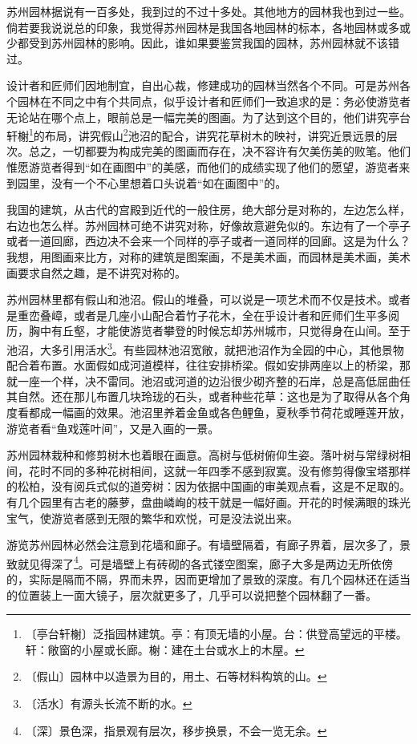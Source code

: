 \documentclass[12pt,UTF-8,openany]{ctexbook}
\begin{document}
\begin{normalsize}
    
    苏州园林据说有一百多处，我到过的不过十多处。其他地方的园林我也到过一些。倘若要我说说总的印象，我觉得苏州园林是我国各地园林的标本，各地园林或多或少都受到苏州园林的影响。因此，谁如果要鉴赏我国的园林，苏州园林就不该错过。
    
    设计者和匠师们因地制宜，自出心裁，修建成功的园林当然各个不同。可是苏州各个园林在不同之中有个共同点，似乎设计者和匠师们一致追求的是：务必使游览者无论站在哪个点上，眼前总是一幅完美的图画。为了达到这个目的，他们讲究亭台轩榭\footnote{〔亭台轩榭〕泛指园林建筑。亭：有顶无墙的小屋。台：供登高望远的平楼。轩：敞窗的小屋或长廊。榭：建在土台或水上的木屋。}的布局，讲究假山\footnote{〔假山〕园林中以造景为目的，用土、石等材料构筑的山。}池沼的配合，讲究花草树木的映衬，讲究近景远景的层次。总之，一切都要为构成完美的图画而存在，决不容许有欠美伤美的败笔。他们惟愿游览者得到“如在画图中”的美感，而他们的成绩实现了他们的愿望，游览者来到园里，没有一个不心里想着口头说着“如在画图中”的。
    
    我国的建筑，从古代的宫殿到近代的一般住房，绝大部分是对称的，左边怎么样，右边也怎么样。苏州园林可绝不讲究对称，好像故意避免似的。东边有了一个亭子或者一道回廊，西边决不会来一个同样的亭子或者一道同样的回廊。这是为什么？我想，用图画来比方，对称的建筑是图案画，不是美术画，而园林是美术画，美术画要求自然之趣，是不讲究对称的。
    
    苏州园林里都有假山和池沼。假山的堆叠，可以说是一项艺术而不仅是技术。或者是重峦叠嶂，或者是几座小山配合着竹子花木，全在乎设计者和匠师们生平多阅历，胸中有丘壑，才能使游览者攀登的时候忘却苏州城市，只觉得身在山间。至于池沼，大多引用活水\footnote{〔活水〕有源头长流不断的水。}。有些园林池沼宽敞，就把池沼作为全园的中心，其他景物配合着布置。水面假如成河道模样，往往安排桥梁。假如安排两座以上的桥梁，那就一座一个样，决不雷同。池沼或河道的边沿很少砌齐整的石岸，总是高低屈曲任其自然。还在那儿布置几块玲珑的石头，或者种些花草：这也是为了取得从各个角度看都成一幅画的效果。池沼里养着金鱼或各色鲤鱼，夏秋季节荷花或睡莲开放，游览者看“鱼戏莲叶间”，又是入画的一景。
    
    苏州园林栽种和修剪树木也着眼在画意。高树与低树俯仰生姿。落叶树与常绿树相间，花时不同的多种花树相间，这就一年四季不感到寂寞。没有修剪得像宝塔那样的松柏，没有阅兵式似的道旁树：因为依据中国画的审美观点看，这是不足取的。有几个园里有古老的藤萝，盘曲嶙峋的枝干就是一幅好画。开花的时候满眼的珠光宝气，使游览者感到无限的繁华和欢悦，可是没法说出来。
    
    游览苏州园林必然会注意到花墙和廊子。有墙壁隔着，有廊子界着，层次多了，景致就见得深了\footnote{〔深〕景色深，指景观有层次，移步换景，不会一览无余。}。可是墙壁上有砖砌的各式镂空图案，廊子大多是两边无所依傍的，实际是隔而不隔，界而未界，因而更增加了景致的深度。有几个园林还在适当的位置装上一面大镜子，层次就更多了，几乎可以说把整个园林翻了一番。
    

\end{normalsize}
\end{document}
